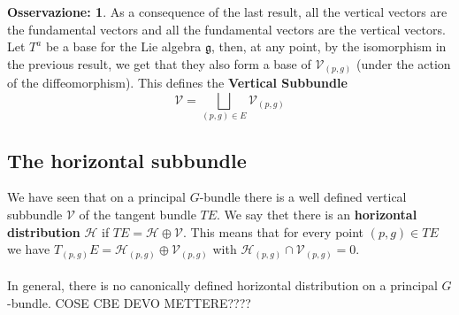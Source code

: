 \documentclass[12pt,a4paper]{report}
\theoremstyle{definition}
\theoremstyle{Theorem}
\theoremstyle{definition}
\theoremstyle{definition}
\theoremstyle{definition}
\newtheorem{Obs}[Def]{Osservazione:}
\begin{document}
		\begin{Obs}
			As a consequence of the last result, all the vertical vectors are the fundamental vectors and all the fundamental vectors are the vertical vectors.\\
			Let $T^a$ be a base for the Lie algebra $\mathfrak{g}$, then, at any point, by the isomorphism in the previous result, we get that they also form a base of $\mathcal{V}_{(p,g)}$ (under the action of the diffeomorphism). This defines the \textbf{Vertical Subbundle} $$\mathcal{V}=\bigsqcup_{(p,g)\in E}\mathcal{V}_{(p,g)}$$
		\end{Obs}
		\subsection{The horizontal subbundle}
		We have seen that on a principal $G$-bundle there is a well defined vertical subbundle $\mathcal{V}$ of the tangent bundle $TE$. We say thet there is an \textbf{horizontal distribution} $\mathcal{H}$ if $TE=\mathcal{H}\oplus\mathcal{V}$. This means that for every point $(p,g)\in TE$ we have $T_{(p,g)}E=\mathcal{H}_{(p,g)}\oplus\mathcal{V}_{(p,g)}$ with $\mathcal{H}_{(p,g)}\cap\mathcal{V}_{(p,g)}=0$.\\
		\\
		In general, there is no canonically defined horizontal distribution on a principal $G$-bundle.
		COSE CBE DEVO METTERE????
\end{document}
